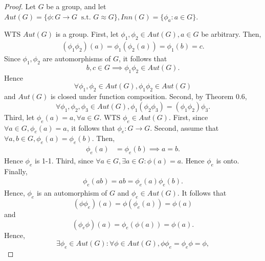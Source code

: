 \documentclass{article}
\theoremstyle{definition}
\begin{document}
 \begin{proof}
     Let $G$ be a group, and let $Aut(G) = \{\phi:G \to G\ \text{ s.t. } G \approx G\}, Inn(G) = \{\phi_a: a \in G\}$.
     
     WTS $Aut(G)$ is a group. First, let $\phi_1,\phi_2 \in Aut(G), a \in G$ be arbitrary. Then,
     \begin{align*}
         (\phi_1\phi_2)(a) = \phi_1(\phi_2(a)) = \phi_1(b) = c.
     \end{align*}
     Since $\phi_1,\phi_2$ are automorphisms of $G$, it follows that
     \begin{equation*}
         b,c \in G \implies \phi_1\phi_2 \in Aut(G).
     \end{equation*}
     Hence 
     \begin{equation*}
         \forall \phi_1,\phi_2 \in Aut(G), \phi_1\phi_2 \in Aut(G)
     \end{equation*}
     and $Aut(G)$ is closed under function composition. Second, by Theorem 0.6,
     \begin{equation*}
         \forall \phi_1,\phi_2,\phi_3 \in Aut(G), \phi_1(\phi_2\phi_3) = (\phi_1\phi_2)\phi_3.
     \end{equation*}
     Third, let $\phi_e(a) = a, \forall a \in G$. WTS $\phi_e \in Aut(G)$. First, since $\forall a \in G, \phi_e(a) = a$, it follows that $\phi_e: G \to G$. Second, assume that $\forall a,b \in G, \phi_e(a) = \phi_e(b)$. Then,
     \begin{align*}
         \phi_e(a) &= \phi_e(b) \implies a = b.
     \end{align*}
     Hence $\phi_e$ is 1-1. Third, since $\forall a \in G, \exists a \in G: \phi(a) = a$. Hence $\phi_e$ is onto. Finally,
     \begin{align*}
         \phi_e(ab) = ab = \phi_e(a)\phi_e(b).
     \end{align*}
     Hence, $\phi_e$ is an automorphism of $G$ and $\phi_e \in Aut(G)$. It follows that
     \begin{equation*}
         (\phi\phi_e)(a) = \phi(\phi_e(a)) = \phi(a) 
     \end{equation*}
     and
     \begin{equation*}
         (\phi_e\phi)(a) = \phi_e(\phi(a)) = \phi(a).
     \end{equation*}
     Hence,
     \begin{equation*}
         \exists \phi_e \in Aut(G): \forall \phi \in Aut(G), \phi\phi_e = \phi_e\phi = \phi,
     \end{equation*}

\end{proof}
\end{document}
